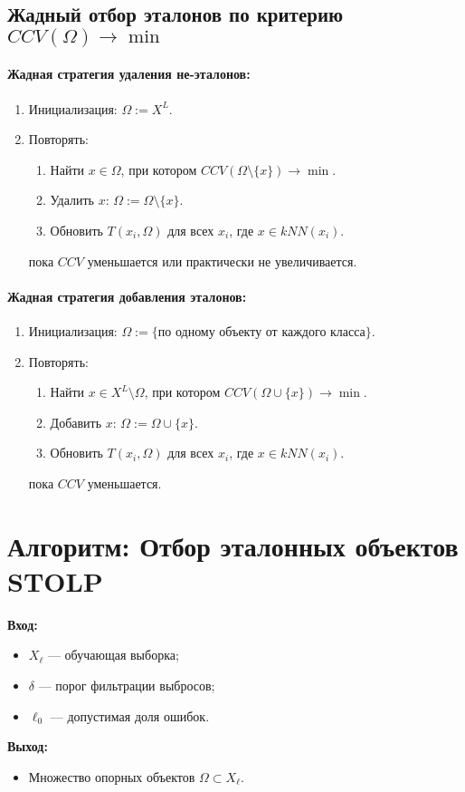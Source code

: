 \subsection*{Жадный отбор эталонов по критерию $CCV(\Omega) \to \min$}

\paragraph{Жадная стратегия удаления не-эталонов:}
\begin{enumerate}
    \item Инициализация: $\Omega := X^L$.
    \item Повторять:
    \begin{enumerate}
        \item Найти $x \in \Omega$, при котором $CCV(\Omega \setminus \{x\}) \to \min$.
        \item Удалить $x$: $\Omega := \Omega \setminus \{x\}$.
        \item Обновить $T(x_i, \Omega)$ для всех $x_i$, где $x \in kNN(x_i)$.
    \end{enumerate}
    пока $CCV$ уменьшается или практически не увеличивается.
\end{enumerate}

\paragraph{Жадная стратегия добавления эталонов:}
\begin{enumerate}
    \item Инициализация: $\Omega := \{\text{по одному объекту от каждого класса}\}$.
    \item Повторять:
    \begin{enumerate}
        \item Найти $x \in X^L \setminus \Omega$, при котором $CCV(\Omega \cup \{x\}) \to \min$.
        \item Добавить $x$: $\Omega := \Omega \cup \{x\}$.
        \item Обновить $T(x_i, \Omega)$ для всех $x_i$, где $x \in kNN(x_i)$.
    \end{enumerate}
    пока $CCV$ уменьшается.
\end{enumerate}

\section{Алгоритм: Отбор эталонных объектов STOLP}
\textbf{Вход:} 
\begin{itemize}
    \item \( X_\ell \) — обучающая выборка;
    \item \( \delta \) — порог фильтрации выбросов;
    \item \( \ell_0 \) — допустимая доля ошибок.
\end{itemize}
\textbf{Выход:}
\begin{itemize}
    \item Множество опорных объектов \( \Omega \subset X_\ell \).
\end{itemize}

